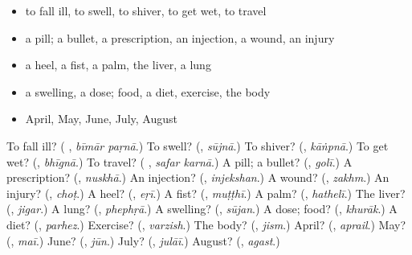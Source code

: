 \begin{itemize}
\raggedright
  \item to fall ill, to swell, to shiver, to get wet, to travel
  \item a pill; a bullet, a prescription, an injection, a wound, an injury
  \item a heel, a fist, a palm, the liver, a lung
  \item a swelling, a dose; food, a diet, exercise, the body
  \item April, May, June, July, August
\end{itemize}

\begin{tcolorbox}[breakable,colback=teal!4,colframe=teal!35!black,title={Before you move on}]
To fall ill? (\textbf{ }, \emph{bīmār paṛnā}.) To swell? (\textbf{}, \emph{sūjnā}.) To shiver? (\textbf{}, \emph{kāṅpnā}.) To get wet? (\textbf{}, \emph{bhīgnā}.) To travel? (\textbf{ }, \emph{safar karnā}.) A pill; a bullet? (\textbf{}, \emph{golī}.) A prescription? (\textbf{}, \emph{nuskhā}.) An injection? (\textbf{}, \emph{injekshan}.) A wound? (\textbf{}, \emph{zakhm}.) An injury? (\textbf{}, \emph{choṭ}.) A heel? (\textbf{}, \emph{eṛī}.) A fist? (\textbf{}, \emph{muṭṭhī}.) A palm? (\textbf{}, \emph{hathelī}.) The liver? (\textbf{}, \emph{jigar}.) A lung? (\textbf{}, \emph{phephṛā}.) A swelling? (\textbf{}, \emph{sūjan}.) A dose; food? (\textbf{}, \emph{khurāk}.) A diet? (\textbf{}, \emph{parhez}.) Exercise? (\textbf{}, \emph{varzish}.) The body? (\textbf{}, \emph{jism}.) April? (\textbf{}, \emph{aprail}.) May? (\textbf{}, \emph{maī}.) June? (\textbf{}, \emph{jūn}.) July? (\textbf{}, \emph{julāī}.) August? (\textbf{}, \emph{agast}.)
\end{tcolorbox}
